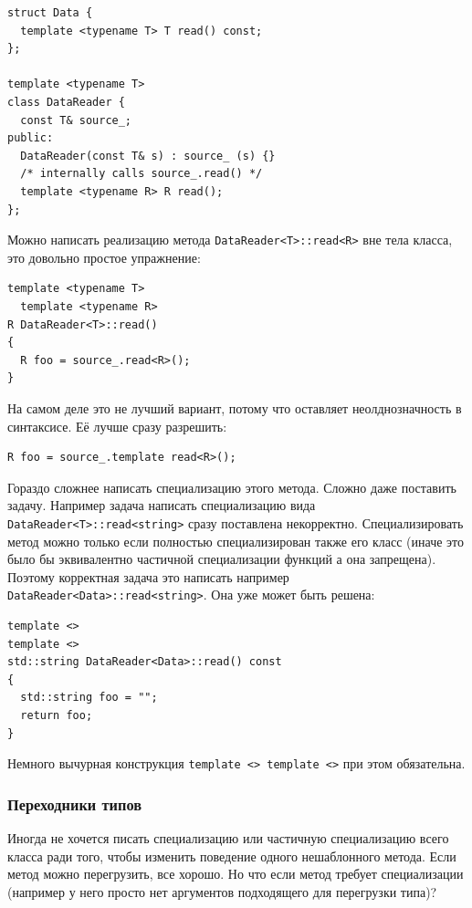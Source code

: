 \documentclass[a4paper,12pt,oneside]{article}
\begin{document}
\begin{lstlisting}
struct Data {
  template <typename T> T read() const;
};

template <typename T>  
class DataReader {
  const T& source_;
public:
  DataReader(const T& s) : source_ (s) {}
  /* internally calls source_.read() */
  template <typename R> R read();
};
\end{lstlisting}

Можно написать реализацию метода \lstinline!DataReader<T>::read<R>! вне тела класса, это довольно простое упражнение:

\begin{lstlisting}
template <typename T>
  template <typename R> 
R DataReader<T>::read()
{
  R foo = source_.read<R>();
}
\end{lstlisting}

На самом деле это не лучший вариант, потому что оставляет неолднозначность в синтаксисе. Её лучше сразу разрешить:

\begin{lstlisting}
R foo = source_.template read<R>();
\end{lstlisting}

Гораздо сложнее написать специализацию этого метода. Сложно даже поставить задачу. Например задача написать специализацию вида \lstinline!DataReader<T>::read<string>! сразу поставлена некорректно. Специализировать метод можно только если полностью специализирован также его класс (иначе это было бы эквивалентно частичной специализации функций а она запрещена). Поэтому корректная задача это написать например \lstinline!DataReader<Data>::read<string>!. Она уже может быть решена:

\begin{lstlisting}
template <> 
template <> 
std::string DataReader<Data>::read() const
{
  std::string foo = "";
  return foo;
}
\end{lstlisting}

Немного вычурная конструкция \lstinline!template <> template <>! при этом обязательна.

\subsubsection{Переходники типов}\label{TypeToTypes}

Иногда не хочется писать специализацию или частичную специализацию всего класса ради того, чтобы изменить поведение одного нешаблонного метода. Если метод можно перегрузить, все хорошо. Но что если метод требует специализации (например у него просто нет аргументов подходящего для перегрузки типа)? 
\end{document}
